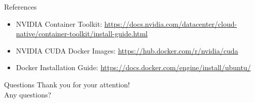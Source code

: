 \documentclass{beamer}
\begin{document}
\begin{frame}{References}
    \begin{itemize}
        \item NVIDIA Container Toolkit: \url{https://docs.nvidia.com/datacenter/cloud-native/container-toolkit/install-guide.html}
        \item NVIDIA CUDA Docker Images: \url{https://hub.docker.com/r/nvidia/cuda}
        \item Docker Installation Guide: \url{https://docs.docker.com/engine/install/ubuntu/}
    \end{itemize}
\end{frame}

\begin{frame}{Questions}
    \centering
    Thank you for your attention!\\
    \vspace{1cm}
    Any questions?
\end{frame}
\end{document}
